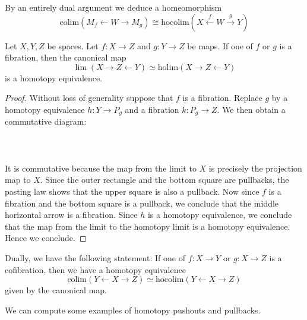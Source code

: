 \documentclass[a4paper]{article}
\begin{document}
By an entirely dual argument we deduce a homeomorphism $$\text{colim}(M_f\leftarrow W\rightarrow M_g)\cong\text{hocolim}(X\overset{f}{\leftarrow}W\overset{g}{\rightarrow}Y)$$

\begin{prp}{}{} Let $X,Y,Z$ be spaces. Let $f:X\to Z$ and $g:Y\to Z$ be maps. If one of $f$ or $g$ is a fibration, then the canonical map $$\lim(X\rightarrow Z\leftarrow Y)\simeq\text{holim}(X\rightarrow Z\leftarrow Y)$$ is a homotopy equivalence. \tcbline
\begin{proof}
Without loss of generality suppose that $f$ is a fibration. Replace $g$ by a homotopy equivalence $h:Y\to P_g$ and a fibration $k:P_g\to Z$. We then obtain a commutative diagram: \\~\\
\\~\\
It is commutative because the map from the limit to $X$ is precisely the projection map to $X$. Since the outer rectangle and the bottom square are pullbacks, the pasting law shows that the upper square is also a pullback. Now since $f$ is a fibration and the bottom square is a pullback, we conclude that the middle horizontal arrow is a fibration. Since $h$ is a homotopy equivalence, we conclude that the map from the limit to the homotopy limit is a homotopy equivalence. Hence we conclude. 
\end{proof}
\end{prp}

Dually, we have the following statement: If one of $f:X\to Y$ or $g:X\to Z$ is a cofibration, then we have a homotopy equivalence $$\text{colim}(Y\leftarrow X\rightarrow Z)\simeq\text{hocolim}(Y\leftarrow X\rightarrow Z)$$ given by the canonical map. 

We can compute some examples of homotopy pushouts and pullbacks. 
\end{document}
